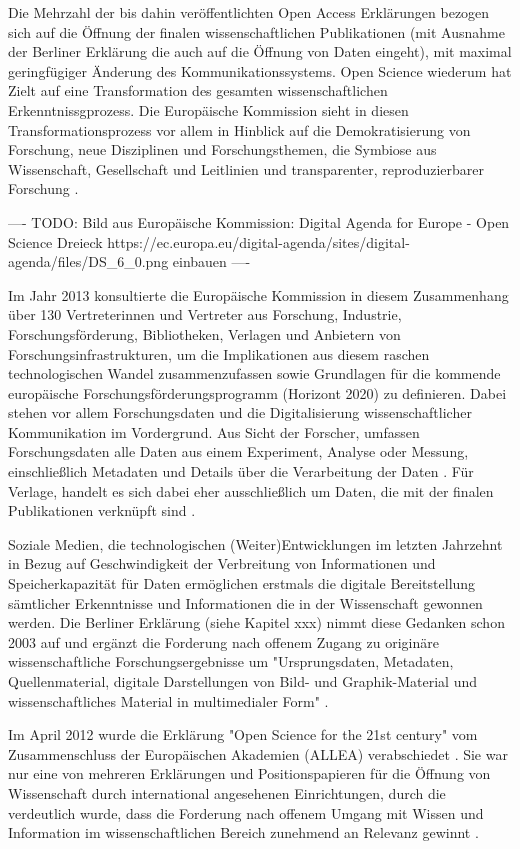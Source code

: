 Die Mehrzahl der bis dahin veröffentlichten Open Access Erklärungen bezogen sich auf die Öffnung der finalen wissenschaftlichen Publikationen (mit Ausnahme der Berliner Erklärung die auch auf die Öffnung von Daten eingeht), mit maximal geringfügiger Änderung des Kommunikationssystems. Open Science wiederum hat Zielt auf eine Transformation des gesamten wissenschaftlichen Erkenntnissgprozess. Die Europäische Kommission sieht in diesen Transformationsprozess vor allem in Hinblick auf die Demokratisierung von Forschung, neue Disziplinen und Forschungsthemen, die Symbiose aus Wissenschaft, Gesellschaft und Leitlinien und transparenter, reproduzierbarer Forschung  \cite{eu_agenda_open_science_2015}.

---- TODO: Bild aus Europäische Kommission: Digital Agenda for Europe - Open Science Dreieck https://ec.europa.eu/digital-agenda/sites/digital-agenda/files/DS_6_0.png einbauen ----

Im Jahr 2013 konsultierte die Europäische Kommission in diesem Zusammenhang über 130 Vertreterinnen und Vertreter aus Forschung, Industrie, Forschungsförderung, Bibliotheken, Verlagen und Anbietern von Forschungsinfrastrukturen, um die Implikationen aus diesem raschen technologischen Wandel zusammenzufassen sowie Grundlagen für die kommende europäische Forschungsförderungsprogramm (Horizont 2020) zu definieren. Dabei stehen vor allem Forschungsdaten und die Digitalisierung wissenschaftlicher Kommunikation im Vordergrund. Aus Sicht der Forscher, umfassen Forschungsdaten alle Daten aus einem Experiment, Analyse oder Messung, einschließlich Metadaten und Details über die Verarbeitung der Daten \cite{eu_consult_data_2013}. Für Verlage, handelt es sich dabei eher ausschließlich um Daten, die mit der finalen Publikationen verknüpft sind \cite{eu_consult_data_2013}.

Soziale Medien, die technologischen (Weiter)Entwicklungen im letzten Jahrzehnt in Bezug auf Geschwindigkeit der Verbreitung von Informationen und Speicherkapazität für Daten ermöglichen erstmals die digitale Bereitstellung sämtlicher Erkenntnisse und Informationen die in der Wissenschaft gewonnen werden. Die Berliner Erklärung (siehe Kapitel xxx) nimmt diese Gedanken schon 2003 auf und ergänzt die Forderung nach offenem Zugang zu originäre wissenschaftliche Forschungsergebnisse um "Ursprungsdaten, Metadaten, Quellenmaterial, digitale Darstellungen von Bild- und Graphik-Material und wissenschaftliches Material in multimedialer Form" \cite{berliner_erklaerung_2003}.

Im April 2012 wurde die Erklärung "Open Science for the 21st century" vom Zusammenschluss der Europäischen Akademien (ALLEA) verabschiedet \cite{ALLEA_2012}. Sie war nur eine von mehreren Erklärungen und Positionspapieren für die Öffnung von Wissenschaft durch international angesehenen Einrichtungen, durch die verdeutlich wurde, dass die Forderung nach offenem Umgang mit Wissen und Information im wissenschaftlichen Bereich zunehmend an Relevanz gewinnt \cite{schulze_2013_open}.

